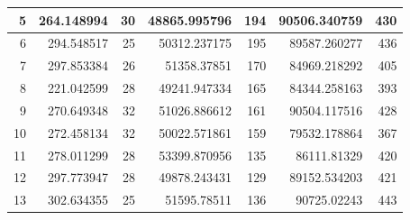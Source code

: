\begin{table}
\begin{adjustwidth}{}{}
{{\begin{tabular}{|r|r|r|r|r|r|r|}
	5                                          & 264.148994                   & 30                                    & 48865.995796                   & 194                                   & 90506.340759                         & 430                                    \\ 
	\hline
	6                                          & 294.548517                   & 25                                    & 50312.237175                   & 195                                   & 89587.260277                         & 436                                    \\ 
	\hline
	7                                          & 297.853384                   & 26                                    & 51358.37851                    & 170                                   & 84969.218292                         & 405                                    \\ 
	\hline
	8                                          & 221.042599                   & 28                                    & 49241.947334                   & 165                                   & 84344.258163                         & 393                                    \\ 
	\hline
	9                                          & 270.649348                   & 32                                    & 51026.886612                   & 161                                   & 90504.117516                         & 428                                    \\ 
	\hline
	10                                         & 272.458134                   & 32                                    & 50022.571861                   & 159                                   & 79532.178864                         & 367                                    \\ 
	\hline
	11                                         & 278.011299                   & 28                                    & 53399.870956                   & 135                                   & 86111.81329                          & 420                                    \\ 
	\hline
	12                                         & 297.773947                   & 28                                    & 49878.243431                   & 129                                   & 89152.534203                         & 421                                    \\ 
	\hline
	13                                         & 302.634355                   & 25                                    & 51595.78511                    & 136                                   & 90725.02243                          & 443                                    \\ 

\end{tabular}}}
\end{adjustwidth}
\end{table}
